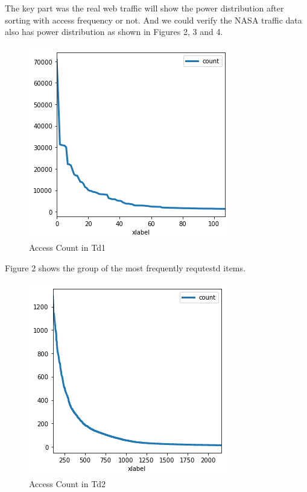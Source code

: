 \documentclass[sigconf,anonymous=true]{acmart}
\begin{document}
\begin{enumerate}
The key part was the real web traffic will show the power distribution after sorting with access frequency or not. And we could verify the NASA traffic data also has power distribution as shown in Figures 2, 3 and 4.
\end{enumerate}

\begin{figure}[H]
    \centering
    \includegraphics[width=0.85\columnwidth]{figs/figure_02_td1.png}
    \caption{Access Count in Td1}
    \label{fig:my_label}
\end{figure}
Figure 2 shows the group of the most frequently requtestd items. 

\begin{figure}[H]
    \centering
    \includegraphics[width=0.85\columnwidth]{figs/figure_03_td2.png}
    \caption{Access Count in Td2}
    \label{fig:my_label}
\end{figure}
\end{document}
